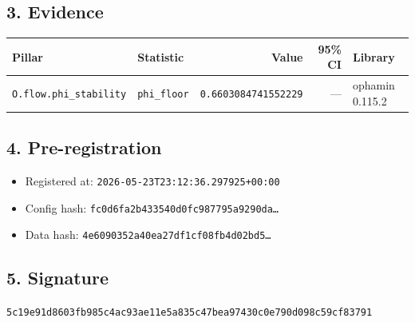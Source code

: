 \documentclass{article}
\begin{document}
\subsection*{3. Evidence}
\begin{tabular}{llrrl}\toprule
\textbf{Pillar} & \textbf{Statistic} & \textbf{Value} & \textbf{95\% CI} & \textbf{Library} \\\midrule
\texttt{O.flow.phi\_stability} & \texttt{phi\_floor} & \texttt{0.6603084741552229} & --- & ophamin 0.115.2 \\
\bottomrule\end{tabular}
\subsection*{4. Pre-registration}
\begin{itemize}
\item Registered at: \texttt{2026-05-23T23:12:36.297925+00:00}
\item Config hash: \texttt{fc0d6fa2b433540d0fc987795a9290da\dots}
\item Data hash: \texttt{4e6090352a40ea27df1cf08fb4d02bd5\dots}
\end{itemize}
\subsection*{5. Signature}
\texttt{5c19e91d8603fb985c4ac93ae11e5a835c47bea97430c0e790d098c59cf83791}\\
\end{document}
